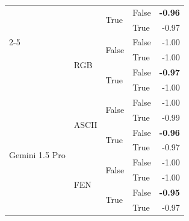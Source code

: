 \documentclass{article}
\begin{document}
\begin{table}
\begin{center}
{\begin{tabular}{@{}llllr@{}}
                                                &                           & \multirow[c]{2}{*}{True}  & False                     &  \textbf{-0.96} \\
                                                &                           &                           & True                      &  -0.97 \\
    \cmidrule{2-5}
                                                & \multirow[c]{4}{*}{RGB}   & \multirow[c]{2}{*}{False} & False                     &  -1.00 \\
                                                &                           &                           & True                      &  -1.00 \\
                                                &                           & \multirow[c]{2}{*}{True}  & False                     &  \textbf{-0.97} \\
                                                &                           &                           & True                      &  -1.00 \\
    \midrule
    \multirow[c]{17}{*}{Gemini 1.5 Pro}         & \multirow[c]{4}{*}{ASCII} & \multirow[c]{2}{*}{False} & False                     & -1.00 \\
                                                &                           &                           & True                      & -0.99 \\
                                                &                           & \multirow[c]{2}{*}{True}  & False                     & \textbf{-0.96} \\
                                                &                           &                           & True                      & -0.97 \\
    \cmidrule{2-5}
                                                & \multirow[c]{4}{*}{FEN}   & \multirow[c]{2}{*}{False} & False                     & -1.00 \\
                                                &                           &                           & True                      & -1.00 \\
                                                &                           & \multirow[c]{2}{*}{True}  & False                     & \textbf{-0.95} \\
                                                &                           &                           & True                      & -0.97 \\

\end{tabular}}
\end{center}
\end{table}
\end{document}

